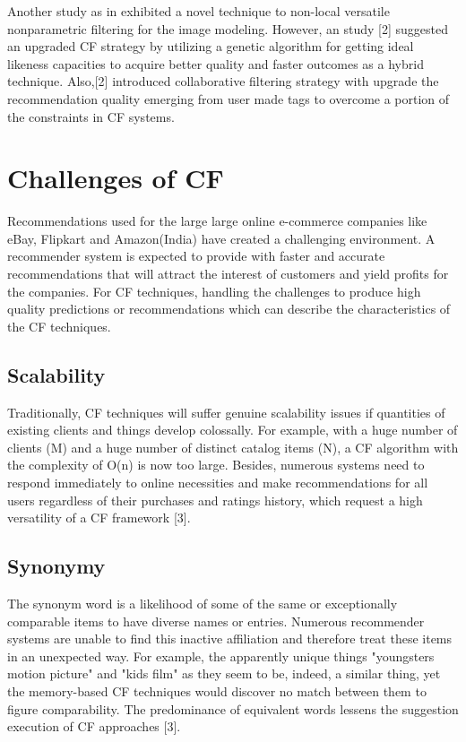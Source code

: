 \documentclass[10pt,conference]{IEEEtran}
\begin{document}
Another study as in \cite{ekstrand2011collaborative} exhibited a novel technique to non-local versatile nonparametric filtering for the image modeling. However, an study [2] suggested an upgraded CF strategy by utilizing a genetic algorithm for getting ideal likeness capacities to acquire better quality and faster outcomes as a hybrid technique. 
Also,[2] introduced collaborative filtering strategy with upgrade the recommendation quality emerging from user made tags to overcome a portion of the constraints in CF systems.

\section{Challenges of CF}
Recommendations used for the large large online e-commerce companies like eBay, Flipkart and Amazon(India) have created a challenging environment. A recommender system is expected to provide with faster and accurate recommendations that will attract the interest of customers and yield profits for the companies. For CF techniques, handling the challenges to produce high quality predictions or recommendations which can describe the characteristics of the CF techniques.

\subsection{Scalability}
Traditionally, CF techniques will suffer genuine scalability issues if quantities of existing clients and things develop colossally. For example, with a huge number of clients (M) and a huge number of distinct catalog items (N), a CF algorithm with the complexity of O(n) is now too large. Besides, numerous systems need to respond immediately to online necessities and make recommendations for all users regardless of their purchases and ratings history, which request a high versatility of a CF framework [3].

\subsection{Synonymy}
The synonym word is a likelihood of some of the same or exceptionally comparable items to have diverse names or entries. Numerous recommender systems are unable to find this inactive affiliation and therefore treat these items in an unexpected way. For example, the apparently unique things "youngsters motion picture" and "kids film" as they seem to be, indeed, a similar thing, yet the memory-based CF techniques would discover no match between them to figure comparability. The predominance of equivalent words lessens the suggestion execution of CF approaches [3].
\end{document}
